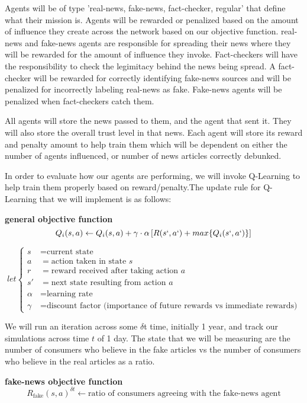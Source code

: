 \documentclass[12pt,twoside]{article}
\begin{document}
Agents will be of type 'real-news, fake-news, fact-checker, regular' that define what their mission is. Agents will be rewarded or penalized based on the amount of influence they create across the network based on our objective function. real-news and fake-news agents are responsible for spreading their news where they will be rewarded for the amount of influence they invoke. Fact-checkers will have the responsibility to check the legimitacy behind the news being spread. A fact-checker will be rewarded for correctly identifying fake-news sources and will be penalized for incorrectly labeling real-news as fake. Fake-news agents will be penalized when fact-checkers catch them.

All agents will store the news passed to them, and the agent that sent it. They will also store the overall trust level in that news. Each agent will store its reward and penalty amount to help train them which will be dependent on either the number of agents influenced, or number of news articles correctly debunked.

In order to evaluate how our agents are performing, we will invoke Q-Learning to help train them properly based on reward/penalty.The update rule for Q-Learning that we will implement is as follows:

\textbf{general objective function}
\[Q_{i}(s, a) \leftarrow Q_{i}(s, a) + \gamma \cdot \alpha  \left[R(s`, a`) + max \{Q_{i}(s`, a`)\}\right]\]

\[
let \left\{
\begin{aligned}
s & = \text{current state} \\
a & = \text{action taken in state } s \\
r & = \text{reward received after taking action } a \\
s' & = \text{next state resulting from action } a \\
\alpha & = \text{learning rate} \\
\gamma & = \text{discount factor (importance of future rewards vs immediate rewards)}
\end{aligned}
\right.
\]

We will run an iteration across some $\delta$t time, initially 1 year, and track our simulations across time $t$ of 1 day. The state that we will be measuring are the number of consumers who believe in the fake articles vs the number of consumers who believe in the real articles as a ratio.

\textbf{fake-news objective function}
\[R_{\text{fake}}(s, a)^{\delta t} \leftarrow \text{ratio of consumers agreeing with the fake-news agent}
\]
\end{document}
